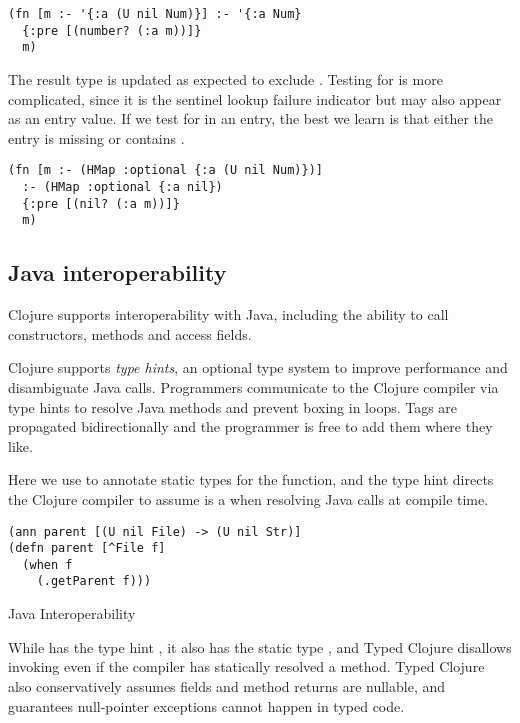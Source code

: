\begin{verbatim}
(fn [m :- '{:a (U nil Num)}] :- '{:a Num}
  {:pre [(number? (:a m))]}
  m)
\end{verbatim}

The result type is updated as expected to exclude .
Testing for  is more complicated, since it is the sentinel
lookup failure indicator but may also appear as an entry value.
If we test for  in an  entry, the best we learn
is that either the entry is missing or contains .

\begin{verbatim}
(fn [m :- (HMap :optional {:a (U nil Num)})] 
  :- (HMap :optional {:a nil})
  {:pre [(nil? (:a m))]}
  m)
\end{verbatim}

\subsection{Java interoperability}

Clojure supports interoperability with Java, including the ability to
call constructors, methods and access fields.

Clojure supports \emph{type hints}, an optional type system to improve performance
and disambiguate Java calls.
Programmers communicate to the Clojure compiler via type hints
to resolve Java methods and prevent boxing in loops. Tags are propagated bidirectionally
and the programmer is free to add them where they like.

Here we use  to annotate static types for the function, and the type hint
 directs the Clojure compiler to assume  is a 
when resolving Java calls at compile time.

\begin{listing}
  \begin{verbatim}
(ann parent [(U nil File) -> (U nil Str)]
(defn parent [^File f]
  (when f
    (.getParent f)))
  \end{verbatim}
\caption{Java Interoperability}
\end{listing}

While  has the type hint , it also has the static type ,
and Typed Clojure disallows invoking  even if the compiler
has statically resolved a method.
Typed Clojure also conservatively assumes fields and method returns are nullable,
and guarantees null-pointer exceptions cannot happen in typed code.

